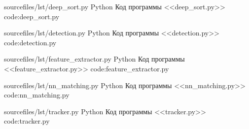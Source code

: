     {sourcefiles/lst/deep_sort.py}
    {Python}
    {Код программы <<deep\_sort.py>>}
    {code:deep_sort.py}

    {sourcefiles/lst/detection.py}
    {Python}
    {Код программы <<detection.py>>}
    {code:detection.py}

    {sourcefiles/lst/feature_extractor.py}
    {Python}
    {Код программы <<feature\_extractor.py>>}
    {code:feature_extractor.py}

    {sourcefiles/lst/nn_matching.py}
    {Python}
    {Код программы <<nn\_matching.py>>}
    {code:nn_matching.py}

    {sourcefiles/lst/tracker.py}
    {Python}
    {Код программы <<tracker.py>>}
    {code:tracker.py}